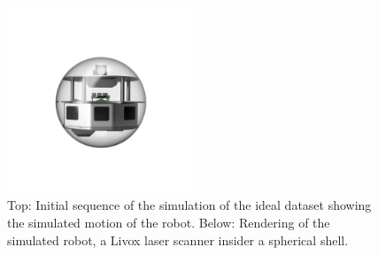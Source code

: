 \begin{figure}
	\includegraphics[width=0.495\textwidth]{images/ProtoRoll2.png}
	\caption{Top: Initial sequence of the simulation of the ideal dataset showing the simulated motion of the robot.
	Below: Rendering of the simulated robot, a Livox laser scanner insider a spherical shell.}
	\label{fig:robotRender}
\end{figure}
